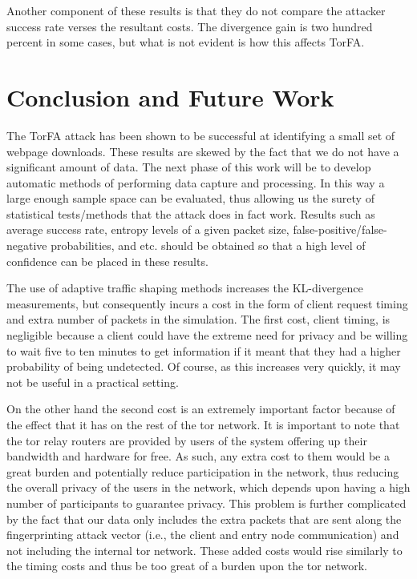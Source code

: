 \documentclass{article}
\begin{document}
Another component of these results is that they do not compare the attacker
success rate verses the resultant costs. The divergence gain is two hundred
percent in some cases, but what is not evident is how this affects TorFA. 

\section{Conclusion and Future Work}
The TorFA attack has been shown to be successful at identifying a small 
set of webpage downloads. These results are skewed by the fact that we
do not have a significant amount of data. The next phase of this work will
be to develop automatic methods of performing data capture and processing. In 
this way a large enough sample space can be
evaluated, thus allowing us the surety of statistical tests/methods that
the attack does in fact work. Results such as average success rate, entropy
levels of a given packet size, false-positive/false-negative probabilities, 
and etc. should be obtained so that a high level of confidence can be placed 
in these results. 

The use of adaptive traffic shaping methods increases the KL-divergence 
measurements, but consequently incurs a cost in the form of client request 
timing and extra number of packets in the simulation. The first cost, 
client timing, is negligible because a client could have the extreme 
need for privacy and be willing to wait five to ten minutes to get 
information if it meant that they had a higher probability of being 
undetected. Of course, as this increases very quickly, it may not be useful 
in a practical setting. 

On the other hand the second cost is an extremely important factor because of 
the effect that it has on the rest of the tor network. It is important to note 
that the tor relay routers are provided by users of the system offering up 
their bandwidth and hardware for free. As such, any extra cost to them would 
be a great burden and potentially reduce participation in the network, thus 
reducing the overall privacy of the users in the network, which depends upon 
having a high number of participants to guarantee privacy. This problem is 
further complicated by the fact that our data only includes the extra packets 
that are sent along the fingerprinting attack vector (i.e., the client and 
entry node communication) and not including the internal tor network. These 
added costs would rise similarly to the timing costs and thus be too great of 
a burden upon the tor network. 
\end{document}
